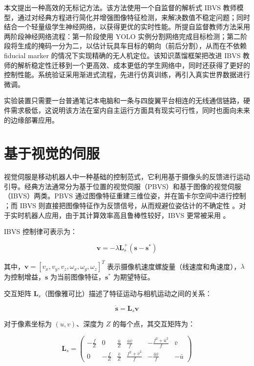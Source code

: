 \documentclass[10pt,twocolumn,letterpaper]{article}
\begin{document}
本文提出一种高效的无标记方法。该方法使用一个自监督的解析式 IBVS 教师模型，通过对经典方程进行简化并增强图像特征检测，来解决数值不稳定问题；同时结合一个轻量级学生神经网络，以获得更优的实时性能。所提自监督教师方法采用两阶段神经网络流程：第一阶段使用 YOLO \cite{redmon2016you, riftiarrasyid2024suitability, yang2025comparative} 实例分割网络完成目标检测；第二阶段将生成的掩码一分为二，以估计玩具车目标的朝向（前后分割），从而在不依赖 fiducial marker 的情况下实现精确的无人机定位。该知识蒸馏框架把改进 IBVS 教师的解析稳定性迁移到一个更高效、成本更低的学生网络中，同时还获得了更好的控制性能。系统验证采用渐进式流程，先进行仿真训练，再引入真实世界数据进行微调。

实验装置只需要一台普通笔记本电脑和一条与四旋翼平台相连的无线通信链路，硬件需求极低，这说明该方法在室内自主运行方面具有现实可行性，同时也面向未来的边缘部署应用。

\section{基于视觉的伺服}
\label{sec:related_work}
视觉伺服是移动机器人中一种基础的控制范式，它利用基于摄像头的反馈进行运动引导。经典方法通常分为基于位置的视觉伺服（PBVS）和基于图像的视觉伺服（IBVS）两类。PBVS 通过图像特征重建三维位姿，并在笛卡尔空间中进行控制 \cite{qin2023perception, sun2025towards}；而 IBVS 则直接把图像特征作为反馈信号，从而规避位姿估计的不确定性 \cite{corke1996visual, yang2020autonomous, lee2012adaptive}。对于实时机器人应用，由于其计算效率高且鲁棒性较好，IBVS 更常被采用 \cite{yang2024high, kumar2024tracking}。

IBVS 控制律可表示为：

\begin{equation}
\mathbf{v} = -\lambda \mathbf{L}_s^+ (\mathbf{s} - \mathbf{s}^*)
\end{equation}

其中，$\mathbf{v} = [v_x, v_y, v_z, \omega_x, \omega_y, \omega_z]^T$ 表示摄像机速度螺旋量（线速度和角速度），$\lambda$ 为控制增益，$\mathbf{s}$ 为当前图像特征，$\mathbf{s}^*$ 为期望特征。

交互矩阵 $\mathbf{L}_s$（图像雅可比）描述了特征运动与相机运动之间的关系：

\begin{equation}
\dot{\mathbf{s}} = \mathbf{L}_s \mathbf{v}
\end{equation}

对于像素坐标为 $(u,v)$、深度为 $Z$ 的每个点，其交互矩阵为：

\begin{equation}
\label{eq:ibvs-full}
\mathbf{L}_s = \begin{pmatrix}
-\frac{f}{Z} & 0 & \frac{\bar{u}}{Z} & \frac{\bar{u} \bar{v}}{f} & -\frac{f^2 + \bar{u}^2}{f} & \bar{v} \\
0 & -\frac{f}{Z} & \frac{\bar{v}}{Z} & \frac{f^2 + \bar{v}^2}{f} & -\frac{\bar{u} \bar{v}}{f} & -\bar{u}
\end{pmatrix}
\end{equation}
\end{document}
